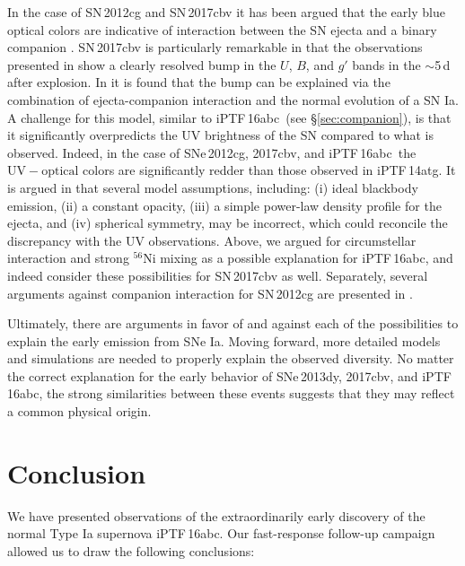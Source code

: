 \documentclass[twocolumn]{aastex61}
\newcommand{\abc}{iPTF\,16abc}
\begin{document}
In the case of SN\,2012cg and SN\,2017cbv it has been argued that the early blue optical colors are indicative of interaction between the SN ejecta and a binary companion \citep{2016ApJ...820...92M,2017ApJ...845L..11H}. SN\,2017cbv is particularly remarkable in that the observations presented in \citet{2017ApJ...845L..11H} show a clearly resolved bump in the $U$, $B$, and $g'$ bands in the $\sim$5\,d after explosion. In \citeauthor{2017ApJ...845L..11H} it is found that the bump can be explained via the combination of ejecta-companion interaction and the normal evolution of a SN Ia. A challenge for this model, similar to \abc\ (see \S\ref{sec:companion}), is that it significantly overpredicts the UV brightness of the SN compared to what is observed. Indeed, in the case of SNe\,2012cg, 2017cbv, and \abc\ the $\mathrm{UV} - \mathrm{optical}$ colors are significantly redder than those observed in iPTF\,14atg. It is argued in \citet{2017ApJ...845L..11H} that several model assumptions, including: (i) ideal blackbody emission, (ii) a constant opacity, (iii) a simple power-law density profile for the ejecta, and (iv) spherical symmetry, may be incorrect, which could reconcile the discrepancy with the UV observations. Above, we argued for circumstellar interaction and strong $^{56}$Ni mixing as a possible explanation for \abc, and indeed \citet{2017ApJ...845L..11H} consider these possibilities for SN\,2017cbv as well. Separately, several arguments against companion interaction for SN\,2012cg are presented in \citet{2016arXiv161007601S}. 

Ultimately, there are arguments in favor of and against each of the possibilities to explain the early emission from SNe Ia. Moving forward, more detailed models and simulations are needed to properly explain the observed diversity. No matter the correct explanation for the early behavior of SNe\,2013dy, 2017cbv, and \abc, the strong similarities between these events suggests that they may reflect a common physical origin. 

\section{Conclusion}
\label{sec:conclusion}

We have presented observations of the extraordinarily early discovery of the 
normal Type Ia supernova \abc. Our fast-response follow-up 
campaign allowed us to draw the following conclusions:
\end{document}
